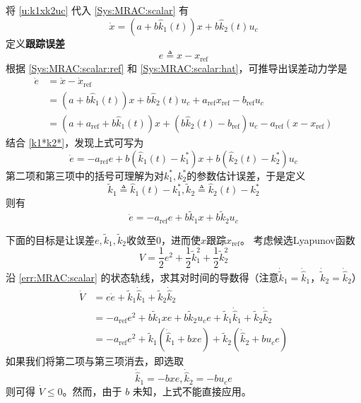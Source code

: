 将 \eqref{u:k1xk2uc} 代入 \eqref{Sys:MRAC:scalar} 有
\begin{equation}
  \dot{x} = (a + b \hat{k}_1 (t)) x + b \hat{k}_2 (t) u_c \label{Sys:MRAC:scalar:hat}
\end{equation}
定义{\bf 跟踪误差}
\begin{equation*}
  e \triangleq x - x_{\ensuremath{\operatorname{ref}}}
\end{equation*}
根据 \eqref{Sys:MRAC:scalar:ref} 和 \eqref{Sys:MRAC:scalar:hat}，可推导出误差动力学是
\begin{align}
  \dot{e} & = \dot{x} - \dot{x}_{\ensuremath{\operatorname{ref}}}
  \nonumber\\
  & = (a + b \hat{k}_1 (t)) x + b \hat{k}_2 (t) u_c +
  a_{\ensuremath{\operatorname{ref}}} x_{\ensuremath{\operatorname{ref}}} -
  b_{\ensuremath{\operatorname{ref}}} u_c \nonumber\\
  & = (a + a_{\ensuremath{\operatorname{ref}}} + b \hat{k}_1 (t)) x + (b
  \hat{k}_2 (t) - b_{\ensuremath{\operatorname{ref}}}) u_c -
  a_{\ensuremath{\operatorname{ref}}} (x - x_{\ensuremath{\operatorname{ref}}}) \nonumber
\end{align}
结合 \eqref{k1*k2*}，发现上式可写为
\[\dot{e} = - a_{\ensuremath{\operatorname{ref}}} e + b (\hat{k}_1(t)-k^{\ast}_1) x + b (\hat{k}_2 (t) - k^{\ast}_2) u_c\]
第二项和第三项中的括号可理解为对$k^{\ast}_1,k^{\ast}_2$的参数估计误差，于是定义
\[\tilde{k}_1 \triangleq\hat{k}_1 (t) - k^{\ast}_1,\tilde{k}_2 \triangleq \hat{k}_2
(t) - k^{\ast}_2\]则有
\begin{equation}
  \dot{e} = - a_{\ensuremath{\operatorname{ref}}} e + b \tilde{k}_1 x + b 
  \tilde{k}_2 u_c  \label{err:MRAC:scalar}
\end{equation}

下面的目标是让误差$e,\tilde{k}_1,\tilde{k}_2$收敛至$0$，进而使$x$跟踪$x_\mathrm{ref}$。
考虑候选Lyapunov函数
\begin{equation}
  V = \frac{1}{2} e^2 + \frac{1}{2} \tilde{k}^2_1 + \frac{1}{2} \tilde{k}^2_2\label{not_implement_candidate}
\end{equation}
沿 \eqref{err:MRAC:scalar} 的状态轨线，求其对时间的导数得（注意$\dot{\tilde{k}}_1=\dot{\hat{k}}_1$，$\dot{\tilde{k}}_2=\dot{\hat{k}}_2$）
\begin{align}
  \dot{V} & = e  \dot{e} + \tilde{k} _1 \dot{\hat{k}}_1 + \tilde{k} _2
  \dot{\hat{k}}_2 \nonumber\\
  & = - a_{\ensuremath{\operatorname{ref}}} e^2 + b \tilde{k} _1 x  e + b
  \tilde{k} _2 u_c e + \tilde{k} _1 \dot{\hat{k}}_1 + \tilde{k} _2
  \dot{\hat{k}}_2 \label{not_implement_vdot_mid}\\
  & = - a_{\ensuremath{\operatorname{ref}}} e^2 + \tilde{k} _1
  (\dot{\hat{k}}_1 + b  x  e) + \tilde{k} _2 (\dot{\hat{k}}_2 + b  u_c e) \label{not_implement_vdot}
\end{align}
如果我们将第二项与第三项消去，即选取
\begin{equation*}
  \dot{\hat{k}}_1 = - b  x  e, \dot{\hat{k}}_2 = - b  u_c e
\end{equation*}
则可得 $\dot{V} \leq 0$。然而，由于 $b$ 未知，上式不能直接应用。

